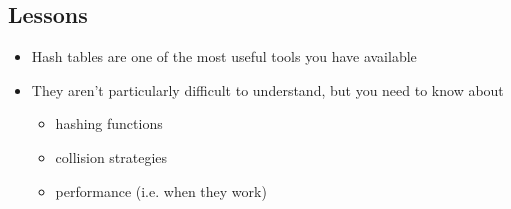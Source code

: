 
\begin{slide}
\section{Lessons}

\begin{PauseHighLight}
  \begin{itemize}
  \item Hash tables are one of the most useful tools you have
    available\pause
  \item They aren't particularly difficult to understand\pause, but you
    need to know about
    \begin{itemize}
    \item hashing functions\pause
    \item collision strategies\pause
    \item performance (i.e. when they work)\pause
    \end{itemize}
  \end{itemize}
\end{PauseHighLight}

\end{slide}
